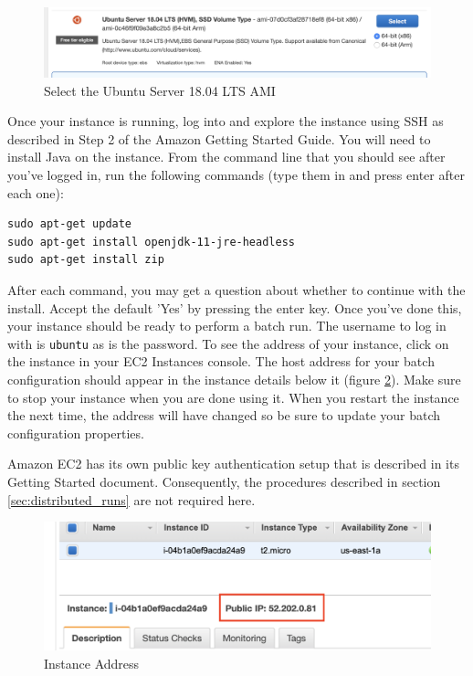 \documentclass[11pt]{amsart}
\begin{document}
\begin{figure}[h]
\begin{center}
\vspace{.2in}
\centerline {
\includegraphics[width=6in]{images/ubuntu_ami.png}
}
\caption{Select the Ubuntu Server 18.04 LTS AMI}
\label{fig:ubuntu_ami}
\end{center}
\end{figure}

Once your instance is running, log into and explore the instance using SSH as described in Step 2 of the Amazon Getting Started Guide. You will need to install Java on the instance. From the command line that you should see after you've logged in, run the following commands (type them in and press enter after each one):

\begin{Verbatim}
sudo apt-get update
sudo apt-get install openjdk-11-jre-headless
sudo apt-get install zip
\end{Verbatim}

After each command, you may get a question about whether to continue with the install. Accept the default 'Yes' by pressing the enter key. Once you've done this, your instance should be ready to perform a batch run. The username to log in with is {\tt ubuntu} as is the password. To see the address of your instance, click on the instance in your EC2 Instances console. The host address for your batch configuration should appear in the instance details below it (figure \ref{fig:instance_addr}). Make sure to stop your instance when you are done using it. When you restart the instance the next time, the address will have changed so be sure to update your batch configuration properties.

Amazon EC2 has its own public key authentication setup that is described in its Getting Started document. Consequently, the procedures described in section \ref{sec:distributed_runs} are not required here.

 \begin{figure}[h]
\begin{center}
\vspace{.2in}
\centerline {
\includegraphics[width=6in]{images/instance_addr.png}
}
\caption{Instance Address}
\label{fig:instance_addr}
\end{center}
\end{figure}
\end{document}
